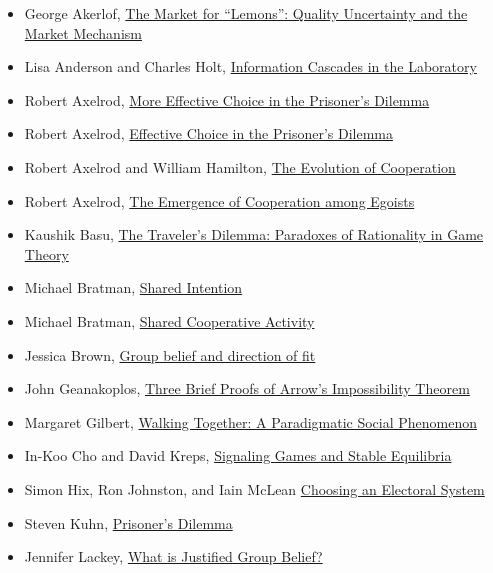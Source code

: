 \documentclass[
  12pt,
  letterpaper,
  DIV=11,
  numbers=noendperiod]{scrartcl}
\providecommand{\tightlist}{%
  \setlength{\itemsep}{0pt}\setlength{\parskip}{0pt}}\usepackage{longtable,booktabs,array}
\begin{document}
\begin{itemize}
\tightlist
\item
  George Akerlof, \href{https://www.jstor.org/stable/1879431}{The Market
  for ``Lemons'': Quality Uncertainty and the Market Mechanism}
\item
  Lisa Anderson and Charles Holt,
  \href{https://www.jstor.org/stable/2951328}{Information Cascades in
  the Laboratory}
\item
  Robert Axelrod, \href{https://www.jstor.org/stable/173638}{More
  Effective Choice in the Prisoner's Dilemma}
\item
  Robert Axelrod, \href{https://www.jstor.org/stable/173932}{Effective
  Choice in the Prisoner's Dilemma}
\item
  Robert Axelrod and William Hamilton,
  \href{https://www.jstor.org/stable/1685895}{The Evolution of
  Cooperation}
\item
  Robert Axelrod, \href{https://www.jstor.org/stable/1961366}{The
  Emergence of Cooperation among Egoists}
\item
  Kaushik Basu, \href{https://www.jstor.org/stable/2117865}{The
  Traveler's Dilemma: Paradoxes of Rationality in Game Theory}
\item
  Michael Bratman, \href{https://philpapers.org/rec/BRASI}{Shared
  Intention}
\item
  Michael Bratman, \href{https://philpapers.org/rec/BRASCA}{Shared
  Cooperative Activity}
\item
  Jessica Brown, \href{https://philpapers.org/rec/BROGBA-3}{Group belief
  and direction of fit}
\item
  John Geanakoplos, \href{https://www.jstor.org/stable/25055941}{Three
  Brief Proofs of Arrow's Impossibility Theorem}
\item
  Margaret Gilbert, \href{https://philpapers.org/rec/GILWTA}{Walking
  Together: A Paradigmatic Social Phenomenon}
\item
  In-Koo Cho and David Kreps,
  \href{https://www.jstor.org/stable/1885060}{Signaling Games and Stable
  Equilibria}
\item
  Simon Hix, Ron Johnston, and Iain McLean
  \href{https://www.thebritishacademy.ac.uk/publications/choosing-electoral-system/}{Choosing
  an Electoral System}
\item
  Steven Kuhn,
  \href{https://plato.stanford.edu/entries/prisoner-dilemma/}{Prisoner's
  Dilemma}
\item
  Jennifer Lackey, \href{https://philpapers.org/rec/LACWIJ}{What is
  Justified Group Belief?}

\end{itemize}
\end{document}
